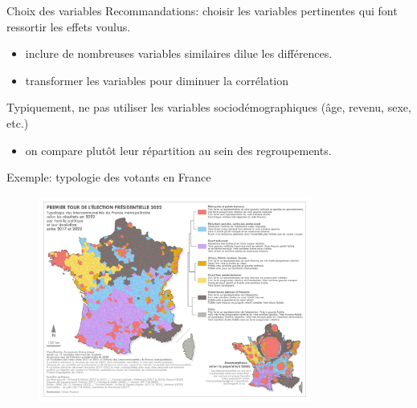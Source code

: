 \documentclass[
  ignorenonframetext,
]{beamer}
\providecommand{\tightlist}{%
  \setlength{\itemsep}{0pt}\setlength{\parskip}{0pt}}\usepackage{longtable,booktabs,array}
\begin{document}
\begin{frame}{Choix des variables}
\protect\hypertarget{choix-des-variables}{}
Recommandations: choisir les variables pertinentes qui font ressortir
les effets voulus.

\begin{itemize}
\tightlist
\item
  inclure de nombreuses variables similaires dilue les différences.
\item
  transformer les variables pour diminuer la corrélation
\end{itemize}

Typiquement, ne pas utiliser les variables sociodémographiques (âge,
revenu, sexe, etc.)

\begin{itemize}
\tightlist
\item
  on compare plutôt leur répartition au sein des regroupements.
\end{itemize}
\end{frame}

\begin{frame}{Exemple: typologie des votants en France}
\protect\hypertarget{exemple-typologie-des-votants-en-france}{}
\begin{figure}

{\centering \includegraphics[width=0.8\textwidth,height=\textheight]{figures/typologie-vote-france.jpg}

}

\end{figure}
\end{frame}
\end{document}
